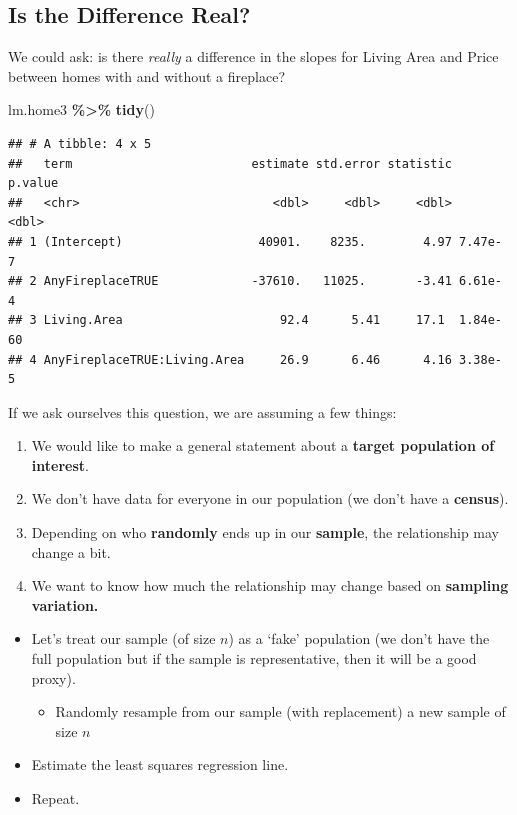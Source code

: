 \documentclass[
]{book}
\newenvironment{Shaded}{\begin{snugshade}}{\end{snugshade}}
\newcommand{\FunctionTok}[1]{\textcolor[rgb]{0.13,0.29,0.53}{\textbf{#1}}}
\newcommand{\NormalTok}[1]{#1}
\newcommand{\SpecialCharTok}[1]{\textcolor[rgb]{0.81,0.36,0.00}{\textbf{#1}}}
\providecommand{\tightlist}{%
  \setlength{\itemsep}{0pt}\setlength{\parskip}{0pt}}
\begin{document}
\subsection{Is the Difference Real?}\label{is-the-difference-real}

We could ask: is there \emph{really} a difference in the slopes for Living Area and Price between homes with and without a fireplace?

\begin{Shaded}
\begin{Highlighting}[]
\NormalTok{lm.home3 }\SpecialCharTok{\%\textgreater{}\%} 
  \FunctionTok{tidy}\NormalTok{()}
\end{Highlighting}
\end{Shaded}

\begin{verbatim}
## # A tibble: 4 x 5
##   term                         estimate std.error statistic  p.value
##   <chr>                           <dbl>     <dbl>     <dbl>    <dbl>
## 1 (Intercept)                   40901.    8235.        4.97 7.47e- 7
## 2 AnyFireplaceTRUE             -37610.   11025.       -3.41 6.61e- 4
## 3 Living.Area                      92.4      5.41     17.1  1.84e-60
## 4 AnyFireplaceTRUE:Living.Area     26.9      6.46      4.16 3.38e- 5
\end{verbatim}

If we ask ourselves this question, we are assuming a few things:

\begin{enumerate}
\def\labelenumi{\arabic{enumi}.}
\item
  We would like to make a general statement about a \textbf{target population of interest}.
\item
  We don't have data for everyone in our population (we don't have a \textbf{census}).
\item
  Depending on who \textbf{randomly} ends up in our \textbf{sample}, the relationship may change a bit.
\item
  We want to know how much the relationship may change based on \textbf{sampling variation.}
\end{enumerate}

\begin{itemize}
\tightlist
\item
  Let's treat our sample (of size \(n\)) as a `fake' population (we don't have the full population but if the sample is representative, then it will be a good proxy).

  \begin{itemize}
  \tightlist
  \item
    Randomly resample from our sample (with replacement) a new sample of size \(n\)
  \end{itemize}
\item
  Estimate the least squares regression line.
\item
  Repeat.
\end{itemize}
\end{document}
